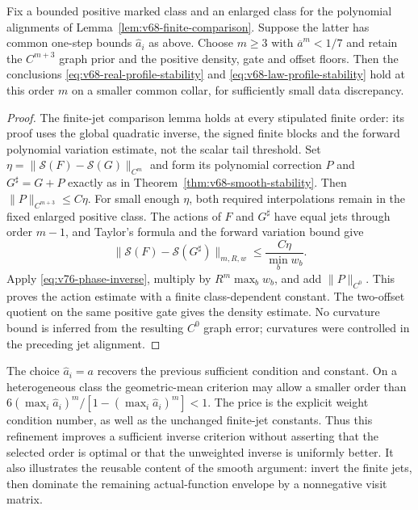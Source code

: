 \begin{corollary}
\label{cor:v76-phase-stability}
Fix a bounded positive marked class and an enlarged class for the
polynomial alignments of Lemma~\ref{lem:v68-finite-comparison}.
Suppose the latter has common one-step bounds $\widehat a_i$ as above.
Choose $m\ge3$ with $\overline a^m<1/7$ and retain the
$C^{m+3}$ graph prior and the positive density, gate and offset floors.
Then the conclusions \eqref{eq:v68-real-profile-stability} and
\eqref{eq:v68-law-profile-stability} hold at this order $m$ on a
smaller common collar, for sufficiently small data discrepancy.
\end{corollary}
\begin{proof}
The finite-jet comparison lemma holds at every stipulated finite order:
its proof uses the global quadratic inverse, the signed finite blocks
and the forward polynomial variation estimate, not the scalar tail
threshold.  Set $\eta=\|\mathcal S(F)-\mathcal S(G)\|_{C^m}$ and
form its polynomial correction $P$ and $G^\sharp=G+P$ exactly as in
Theorem~\ref{thm:v68-smooth-stability}.  Then
$\|P\|_{C^{m+3}}\le C\eta$.  For small enough $\eta$, both required
interpolations remain in the fixed enlarged positive class.  The actions
of $F$ and $G^\sharp$ have equal jets through order $m-1$, and
Taylor's formula and the forward variation bound give
\[
 \|\mathcal S(F)-\mathcal S(G^\sharp)\|_{m,R,w}
 \le \frac{C\eta}{\min_bw_b}.
\]
Apply \eqref{eq:v76-phase-inverse}, multiply by
$R^m\max_bw_b$, and add $\|P\|_{C^0}$.  This proves the action
estimate with a finite class-dependent constant.  The two-offset
quotient on the same positive gate gives the density estimate.
No curvature bound is inferred from the resulting $C^0$ graph error;
curvatures were controlled in the preceding jet alignment.
\end{proof}

The choice $\widehat a_i=a$ recovers the previous sufficient condition
and constant.  On a heterogeneous class the geometric-mean criterion
may allow a smaller order than $6(\max_i\widehat a_i)^m/
[1-(\max_i\widehat a_i)^m]<1$.  The price is the explicit weight
condition number, as well as the unchanged finite-jet constants.
Thus this refinement improves a sufficient inverse criterion without
asserting that the selected order is optimal or that the unweighted
inverse is uniformly better.  It also illustrates the reusable content
of the smooth argument: invert the finite jets, then dominate the
remaining actual-function envelope by a nonnegative visit matrix.
